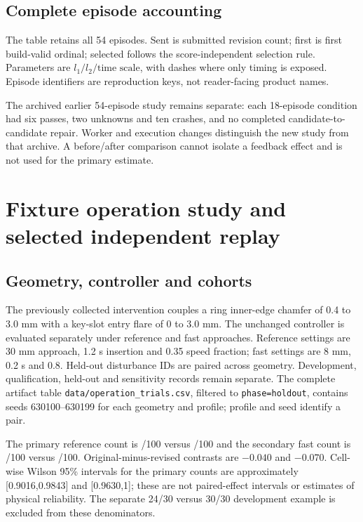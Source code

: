 \subsection{Complete episode accounting}
The table retains all 54 episodes. Sent is submitted revision count; first is first build-valid ordinal; selected follows the score-independent selection rule. Parameters are $l_1/l_2/\text{time scale}$, with dashes where only timing is exposed. Episode identifiers are reproduction keys, not reader-facing product names.
\begin{center}\scriptsize\end{center}

The archived earlier 54-episode study remains separate: each 18-episode condition had six passes, two unknowns and ten crashes, and no completed candidate-to-candidate repair. Worker and execution changes distinguish the new study from that archive. A before/after comparison cannot isolate a feedback effect and is not used for the primary estimate.

\section{Fixture operation study and selected independent replay}
\subsection{Geometry, controller and cohorts}
The previously collected intervention couples a ring inner-edge chamfer of 0.4 to 3.0 mm with a key-slot entry flare of 0 to 3.0 mm. The unchanged controller is evaluated separately under reference and fast approaches. Reference settings are 30 mm approach, 1.2 s insertion and 0.35 speed fraction; fast settings are 8 mm, 0.2 s and 0.8. Held-out disturbance IDs are paired across geometry. Development, qualification, held-out and sensitivity records remain separate. The complete artifact table \texttt{data/operation\_trials.csv}, filtered to \texttt{phase=holdout}, contains seeds 630100--630199 for each geometry and profile; profile and seed identify a pair.

The primary reference count is \ETwoReferenceOriginal{}/100 versus \ETwoReferenceRevised{}/100 and the secondary fast count is \ETwoFastOriginal{}/100 versus \ETwoFastRevised{}/100. Original-minus-revised contrasts are $-0.040$ and $-0.070$. Cell-wise Wilson 95\% intervals for the primary counts are approximately [0.9016,0.9843] and [0.9630,1]; these are not paired-effect intervals or estimates of physical reliability. The separate 24/30 versus 30/30 development example is excluded from these denominators.

